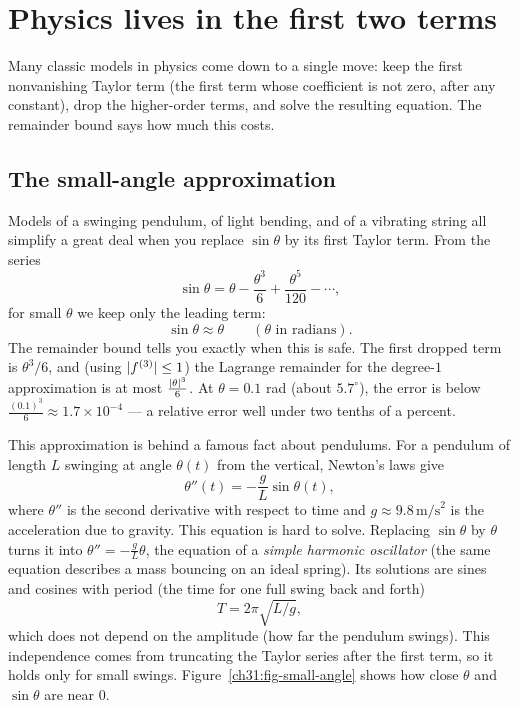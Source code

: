\section{Physics lives in the first two terms}

Many classic models in physics come down to a single move: keep the first nonvanishing Taylor
term (the first term whose coefficient is not zero, after any constant), drop the higher-order
terms, and solve the resulting equation. The remainder bound says how much this costs.

\subsection{The small-angle approximation}

Models of a swinging pendulum, of light bending, and of a vibrating string all
simplify a great deal when you replace $\sin\theta$ by its first Taylor term. From the series
\[
  \sin\theta = \theta - \frac{\theta^3}{6} + \frac{\theta^5}{120} - \cdots,
\]
for small $\theta$ we keep only the leading term:
\[
  \sin\theta \approx \theta \qquad (\theta \text{ in radians}).
\]
The remainder bound tells you exactly when this is safe. The first dropped term is
$\theta^3/6$, and (using $\lvert f^{(3)}\rvert \le 1$) the Lagrange remainder for the
degree-$1$ approximation is at most $\frac{\lvert\theta\rvert^3}{6}$. At
$\theta = 0.1$ rad (about $5.7^\circ$), the error is below
$\frac{(0.1)^3}{6} \approx 1.7\times 10^{-4}$ --- a relative error well under two tenths
of a percent.

This approximation is behind a famous fact about pendulums. For a pendulum of length
$L$ swinging at angle $\theta(t)$ from the vertical, Newton's laws give
\[
  \theta''(t) = -\frac{g}{L}\sin\theta(t),
\]
where $\theta''$ is the second derivative with respect to time and
$g \approx 9.8\,\text{m/s}^2$ is the acceleration due to gravity. This equation is hard
to solve. Replacing $\sin\theta$ by $\theta$ turns it into $\theta'' = -\frac{g}{L}\theta$,
the equation of a \emph{simple harmonic oscillator} (the same equation describes a mass
bouncing on an ideal spring). Its solutions are sines and cosines with period (the time
for one full swing back and forth)
\[
  T = 2\pi\sqrt{L/g},
\]
which does not depend on the amplitude (how far the pendulum swings). This independence
comes from truncating the Taylor series after the first term, so it holds only for small
swings. Figure~\ref{ch31:fig-small-angle} shows how close $\theta$ and $\sin\theta$ are
near $0$.

